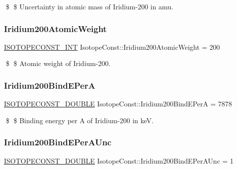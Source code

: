 \$ \$ Uncertainty in atomic mass of Iridium-\/200 in amu. \mbox{\label{group___isotope_const-_iridium-_ir200_ga95f22dd47ea748d22e6c8600291822fa}} 
\subsubsection{\texorpdfstring{Iridium200\+Atomic\+Weight}{Iridium200AtomicWeight}}
{\footnotesize\ttfamily \mbox{\hyperlink{group___isotope_const-_macros_ga5f18360b3e99483a35c32d789e62621c}{I\+S\+O\+T\+O\+P\+E\+C\+O\+N\+S\+T\+\_\+\+I\+NT}} Isotope\+Const\+::\+Iridium200\+Atomic\+Weight = 200}

\$ \$ Atomic weight of Iridium-\/200. \mbox{\label{group___isotope_const-_iridium-_ir200_gae97d7f7b04d15a5150948c993ecd91dd}} 
\subsubsection{\texorpdfstring{Iridium200\+Bind\+E\+PerA}{Iridium200BindEPerA}}
{\footnotesize\ttfamily \mbox{\hyperlink{group___isotope_const-_macros_ga8f45a7272ce02c0b4c65c44636ed719a}{I\+S\+O\+T\+O\+P\+E\+C\+O\+N\+S\+T\+\_\+\+D\+O\+U\+B\+LE}} Isotope\+Const\+::\+Iridium200\+Bind\+E\+PerA = 7878}

\$ \$ Binding energy per A of Iridium-\/200 in keV. \mbox{\label{group___isotope_const-_iridium-_ir200_ga8d1b06b616568b4be42af9152002e326}} 
\subsubsection{\texorpdfstring{Iridium200\+Bind\+E\+Per\+A\+Unc}{Iridium200BindEPerAUnc}}
{\footnotesize\ttfamily \mbox{\hyperlink{group___isotope_const-_macros_ga8f45a7272ce02c0b4c65c44636ed719a}{I\+S\+O\+T\+O\+P\+E\+C\+O\+N\+S\+T\+\_\+\+D\+O\+U\+B\+LE}} Isotope\+Const\+::\+Iridium200\+Bind\+E\+Per\+A\+Unc = 1}

